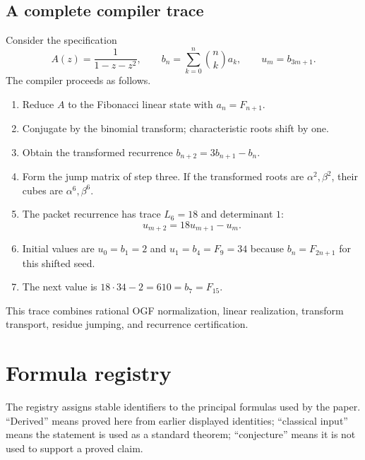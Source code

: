 \documentclass[11pt]{article}
\theoremstyle{definition}\newtheorem{definition}[theorem]{Definition}\newtheorem{example}[theorem]{Example}\newtheorem{construction}[theorem]{Construction}\newtheorem{algorithm}[theorem]{Algorithm}\newtheorem{conjecture}[theorem]{Conjecture}\newtheorem{problem}[theorem]{Problem}
\theoremstyle{remark}\newtheorem{remark}[theorem]{Remark}\newtheorem{boundary}[theorem]{Boundary}\newtheorem{certificate}[theorem]{Computational Certificate}\newtheorem{classical}[theorem]{Classical Input}\newtheorem{principle}[theorem]{Structural Principle}
\begin{document}
\subsection{A complete compiler trace}
Consider the specification
\[
 A(z)=\frac{1}{1-z-z^2},
 \qquad
 b_n=\sum_{k=0}^{n}\binom nka_k,
 \qquad
 u_m=b_{3m+1}.
\]
The compiler proceeds as follows.
\begin{enumerate}
\item Reduce $A$ to the Fibonacci linear state with $a_n=F_{n+1}$.
\item Conjugate by the binomial transform; characteristic roots shift by one.
\item Obtain the transformed recurrence $b_{n+2}=3b_{n+1}-b_n$.
\item Form the jump matrix of step three.  If the transformed roots are $\alpha^2,\beta^2$, their cubes are $\alpha^6,\beta^6$.
\item The packet recurrence has trace $L_6=18$ and determinant $1$:
\[
 u_{m+2}=18u_{m+1}-u_m.
\]
\item Initial values are $u_0=b_1=2$ and $u_1=b_4=F_9=34$ because $b_n=F_{2n+1}$ for this shifted seed.
\item The next value is $18\cdot34-2=610=b_7=F_{15}$.
\end{enumerate}
This trace combines rational OGF normalization, linear realization, transform transport, residue jumping, and recurrence certification.


\section{Formula registry}

The registry assigns stable identifiers to the principal formulas used by the paper.  ``Derived'' means proved here from earlier displayed identities; ``classical input'' means the statement is used as a standard theorem; ``conjecture'' means it is not used to support a proved claim.
\end{document}
